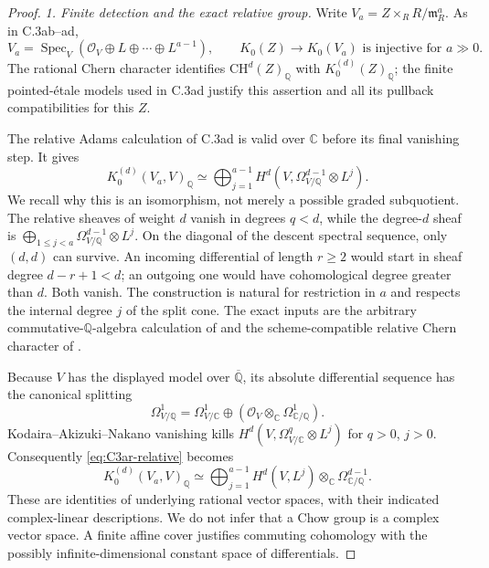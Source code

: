 \begin{proof}
\emph{1. Finite detection and the exact relative group.}
Write $V_a=Z\times_R R/\mathfrak m_R^a$. As in C.3ab--ad,
\[
 V_a=\operatorname{Spec}_V
       (\mathcal O_V\oplus L\oplus\cdots\oplus L^{a-1}),
 \qquad K_0(Z)\longrightarrow K_0(V_a)
                   \text{ is injective for }a\gg0.
\]
The rational Chern character identifies
$\mathrm{CH}^d(Z)_{\mathbb Q}$ with $K_0^{(d)}(Z)_{\mathbb Q}$;
the finite pointed-\'etale models used in C.3ad justify this assertion
and all its pullback compatibilities for this $Z$.

The relative Adams calculation of C.3ad is valid over $\mathbb C$
before its final vanishing step. It gives
\begin{equation}\label{eq:C3ar-relative}
 K_0^{(d)}(V_a,V)_{\mathbb Q}
   \simeq\bigoplus_{j=1}^{a-1}
       H^d(V,\Omega^{d-1}_{V/\mathbb Q}\otimes L^j).
\end{equation}
We recall why this is an isomorphism, not merely a possible graded
subquotient. The relative sheaves of weight $d$ vanish in degrees
$q<d$, while the degree-$d$ sheaf is
$\bigoplus_{1\le j<a}\Omega^{d-1}_{V/\mathbb Q}\otimes L^j$.
On the diagonal of the descent spectral sequence, only $(d,d)$
can survive. An incoming differential of length $r\ge2$ would
start in sheaf degree $d-r+1<d$; an outgoing one would have
cohomological degree greater than $d$. Both vanish. The construction
is natural for restriction in $a$ and respects the internal degree
$j$ of the split cone. The exact inputs are the arbitrary
commutative-$\mathbb Q$-algebra calculation of
\citet[Theorems 4.6.7--4.6.8, pp.~151--152]{D_Loday1992} and
the scheme-compatible relative Chern character of
\citet[Theorem 6.1, Corollary 6.2 and Theorem B.10,
author pp.~15 and 25]{D_CortinasHaesemeyerWeibel2009}.

Because $V$ has the displayed model over $\overline{\mathbb Q}$,
its absolute differential sequence has the canonical splitting
\[
 \Omega^1_{V/\mathbb Q}
  =\Omega^1_{V/\mathbb C}\oplus
                 (\mathcal O_V\otimes_{\mathbb C}
                           \Omega^1_{\mathbb C/\mathbb Q}).
\]
Kodaira--Akizuki--Nakano vanishing kills
$H^d(V,\Omega^q_{V/\mathbb C}\otimes L^j)$ for $q>0$, $j>0$.
Consequently \eqref{eq:C3ar-relative} becomes
\begin{equation}\label{eq:C3ar-absolute}
 K_0^{(d)}(V_a,V)_{\mathbb Q}
 \simeq\bigoplus_{j=1}^{a-1}
       H^d(V,L^j)\otimes_{\mathbb C}
                         \Omega^{d-1}_{\mathbb C/\mathbb Q}.
\end{equation}
These are identities of underlying rational vector spaces, with their
indicated complex-linear descriptions. We do not infer that a Chow
group is a complex vector space. A finite affine cover justifies
commuting cohomology with the possibly infinite-dimensional constant
space of differentials.


\end{proof}
